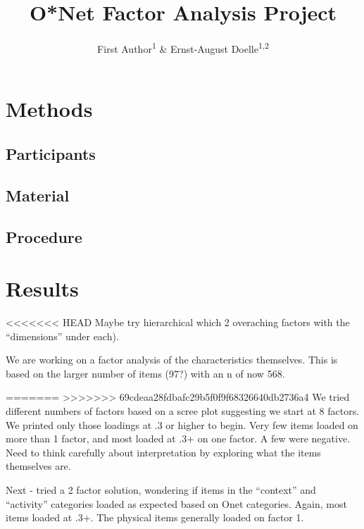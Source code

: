 \documentclass[
  english,
  man]{apa6}
\title{O*Net Factor Analysis Project}
\author{First Author\textsuperscript{1} \& Ernst-August Doelle\textsuperscript{1,2}}
\date{}
\affiliation{\vspace{0.5cm}\textsuperscript{1} Wilhelm-Wundt-University\\\textsuperscript{2} Konstanz Business School}
\begin{document}
\maketitle

\hypertarget{methods}{%
\section{Methods}\label{methods}}

\hypertarget{participants}{%
\subsection{Participants}\label{participants}}

\hypertarget{material}{%
\subsection{Material}\label{material}}

\hypertarget{procedure}{%
\subsection{Procedure}\label{procedure}}

\hypertarget{results}{%
\section{Results}\label{results}}

<<<<<<< HEAD
Maybe try hierarchical which 2 overaching factors with the ``dimensions'' under each).

We are working on a factor analysis of the characteristics themselves. This is based on the larger number of items (97?) with an n of now 568.

=======
>>>>>>> 69cdeaa28fdbafc29b5f0f9f68326640db2736a4
We tried different numbers of factors based on a scree plot suggesting we start at 8 factors. We printed only those loadings at .3 or higher to begin. Very few items loaded on more than 1 factor, and most loaded at .3+ on one factor. A few were negative. Need to think carefully about interpretation by exploring what the items themselves are.

Next - tried a 2 factor solution, wondering if items in the ``context'' and ``activity'' categories loaded as expected based on Onet categories. Again, most items loaded at .3+. The physical items generally loaded on factor 1.
\end{document}
